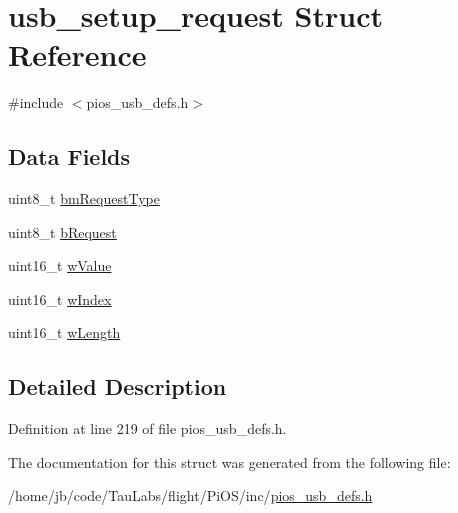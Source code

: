 \hypertarget{structusb__setup__request}{\section{usb\-\_\-setup\-\_\-request \-Struct \-Reference}
\label{structusb__setup__request}
}


{\ttfamily \#include $<$pios\-\_\-usb\-\_\-defs.\-h$>$}

\subsection*{\-Data \-Fields}
\begin{DoxyCompactItemize}
\item 
uint8\-\_\-t \hyperlink{group___p_i_o_s___u_s_b___d_e_f_s_ga6724d6067f78659da89e2abac5040207}{bm\-Request\-Type}
\item 
uint8\-\_\-t \hyperlink{group___p_i_o_s___u_s_b___d_e_f_s_ga55cbbe5ea2f7842c4df02bda43532cb5}{b\-Request}
\item 
uint16\-\_\-t \hyperlink{group___p_i_o_s___u_s_b___d_e_f_s_ga1f14de3d7b02c5e6ba04cf9334e0d259}{w\-Value}
\item 
uint16\-\_\-t \hyperlink{group___p_i_o_s___u_s_b___d_e_f_s_ga1469080fa91077cdc69a2f4dd5509974}{w\-Index}
\item 
uint16\-\_\-t \hyperlink{group___p_i_o_s___u_s_b___d_e_f_s_gae0ab089c03a957e9e3a61874d5565d44}{w\-Length}
\end{DoxyCompactItemize}


\subsection{\-Detailed \-Description}


\-Definition at line 219 of file pios\-\_\-usb\-\_\-defs.\-h.



\-The documentation for this struct was generated from the following file\-:\begin{DoxyCompactItemize}
\item 
/home/jb/code/\-Tau\-Labs/flight/\-Pi\-O\-S/inc/\hyperlink{pios__usb__defs_8h}{pios\-\_\-usb\-\_\-defs.\-h}\end{DoxyCompactItemize}
